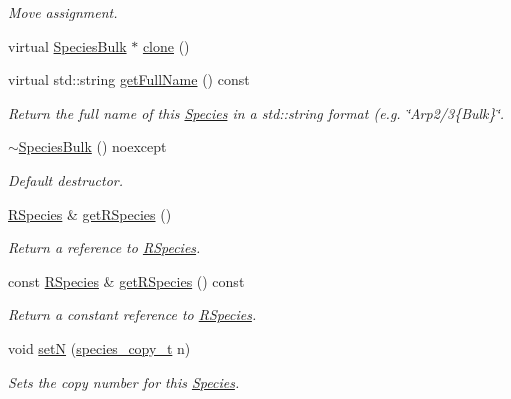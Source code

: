 \begin{DoxyCompactItemize}
\begin{DoxyCompactList}\small\item\em Move assignment. \end{DoxyCompactList}\item 
virtual \hyperlink{classchem_1_1SpeciesBulk}{Species\-Bulk} $\ast$ \hyperlink{classchem_1_1SpeciesBulk_a7bfdd13273d7328c2f7d275796e57873}{clone} ()
\item 
virtual std\-::string \hyperlink{classchem_1_1SpeciesBulk_a340d3f16e075352bf1cbab7918f5ca20}{get\-Full\-Name} () const 
\begin{DoxyCompactList}\small\item\em Return the full name of this \hyperlink{classchem_1_1Species}{Species} in a std\-::string format (e.\-g. \char`\"{}\-Arp2/3\{\-Bulk\}\char`\"{}. \end{DoxyCompactList}\item 
\hyperlink{classchem_1_1SpeciesBulk_ae9f7976efc0117e213b1a616e1216d5d}{$\sim$\-Species\-Bulk} () noexcept
\begin{DoxyCompactList}\small\item\em Default destructor. \end{DoxyCompactList}\item 
\hyperlink{classchem_1_1RSpecies}{R\-Species} \& \hyperlink{classchem_1_1Species_a1719a8155a69e9a62593d23d4bfc8514}{get\-R\-Species} ()
\begin{DoxyCompactList}\small\item\em Return a reference to \hyperlink{classchem_1_1RSpecies}{R\-Species}. \end{DoxyCompactList}\item 
const \hyperlink{classchem_1_1RSpecies}{R\-Species} \& \hyperlink{classchem_1_1Species_a438dae186317809effdd040ed38c568b}{get\-R\-Species} () const 
\begin{DoxyCompactList}\small\item\em Return a constant reference to \hyperlink{classchem_1_1RSpecies}{R\-Species}. \end{DoxyCompactList}\item 
void \hyperlink{classchem_1_1Species_af10a33a212fdb986fb93613e9c219f7a}{set\-N} (\hyperlink{common_8h_a3503f321fd36304ee274141275cca586}{species\-\_\-copy\-\_\-t} n)
\begin{DoxyCompactList}\small\item\em Sets the copy number for this \hyperlink{classchem_1_1Species}{Species}. \end{DoxyCompactList}\item 

\end{DoxyCompactItemize}
